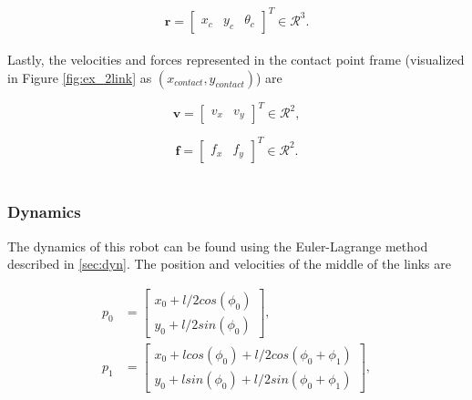 \begin{equation}
    \mathbf{r} = 
    \begin{bmatrix}
        x_c & y_c & \theta_c
    \end{bmatrix}^T \in \mathcal{R}^3.
\end{equation}
\\

Lastly, the velocities and forces represented in the contact point frame (visualized in Figure \ref{fig:ex_2link} as $(x_{contact}, y_{contact})$) are 

\begin{equation}
    \mathbf{v} =
    \begin{bmatrix}
        v_x & v_y
    \end{bmatrix}^T \in \mathcal{R}^2,
\end{equation}

\begin{equation}
    \mathbf{f} =
    \begin{bmatrix}
        f_x & f_y
    \end{bmatrix}^T \in \mathcal{R}^2.
\end{equation}
\\

\subsubsection{Dynamics}

The dynamics of this robot can be found using the Euler-Lagrange method described in \ref{sec:dyn}.
The position and velocities of the middle of the links are

\begin{equation}
    \begin{split}
        p_0 &=
        \begin{bmatrix}
            x_0 + l/2 cos(\phi_0)\\
            y_0 + l/2 sin(\phi_0)
        \end{bmatrix}, \\
        p_1 &=
        \begin{bmatrix}
            x_0 + l cos(\phi_0) + l/2 cos(\phi_0+ \phi_1)\\
            y_0 + l sin(\phi_0) + l/2 sin(\phi_0+\phi_1)
        \end{bmatrix},
    \end{split}
\end{equation}

